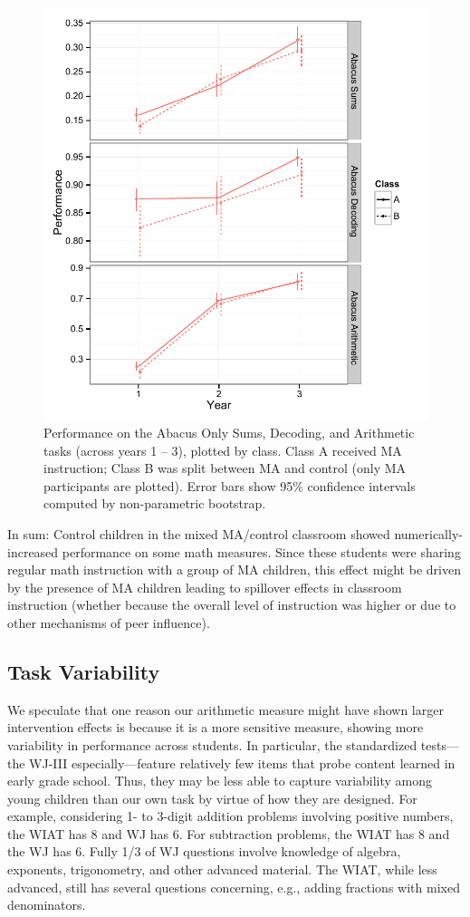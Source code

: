 \documentclass[11pt]{article}
\begin{document}
\begin{figure}[H]
\begin{center}
\includegraphics[width=4.5in]{figures/abacus_class.pdf}
\end{center}
\caption{Performance on the Abacus Only Sums, Decoding, and Arithmetic tasks (across years 1 -- 3), plotted by class. Class A received MA instruction; Class B was split between MA and control (only MA participants are plotted). Error bars show 95\% confidence intervals computed by non-parametric bootstrap.}
\label{fig:abacus_class}
\end{figure}


In sum: Control children in the mixed MA/control classroom showed numerically-increased performance on some math measures. Since these students were sharing regular math instruction with a group of MA children, this effect might be driven by the presence of MA children leading to spillover effects in classroom instruction (whether because the overall level of instruction was higher or due to other mechanisms of peer influence).

\subsection{Task Variability}

We speculate that one reason our arithmetic measure might have shown larger intervention effects is because it is a more sensitive measure, showing more variability in performance across students. In particular, the standardized tests---the WJ-III especially---feature relatively few items that probe content learned in early grade school. Thus, they may be less able to capture variability among young children than our own task by virtue of how they are designed. For example, considering 1- to 3-digit addition problems involving positive numbers, the WIAT has 8 and WJ has 6. For subtraction problems, the WIAT has 8 and the WJ has 6. Fully 1/3 of WJ questions involve knowledge of algebra, exponents, trigonometry, and other advanced material. The WIAT, while less advanced, still has several questions concerning, e.g., adding fractions with mixed denominators. 
\end{document}

